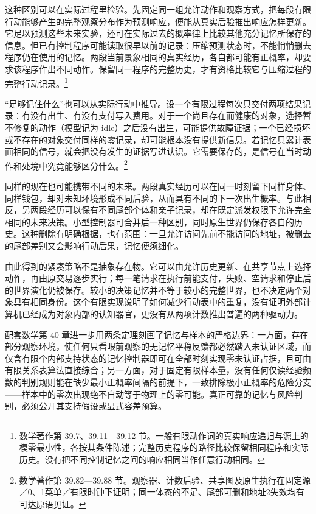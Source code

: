 \documentclass[
  11pt,
  oneside]{book}
\begin{document}
这种区别可以在实际过程里检验。先固定同一组允许动作和观察方式，把每段有限行动能够产生的完整观察分布作为预测响应，便能从真实后验推出响应怎样更新。它足以预测这些未来实验，还可在实际过去的概率律上比较其他充分记忆所保存的信息。但已有控制程序可能读取很早以前的记录：压缩预测状态时，不能悄悄删去程序仍在使用的记忆。两段当前景象相同的真实经历，各自都可能有正概率，却要求该程序作出不同动作。保留同一程序的完整历史，才有资格比较它与压缩过程的完整行动记录。\footnote{\hypertarget{ph-note-21}{}数学著作第 39.7、39.11---39.12 节。一般有限动作词的真实响应递归与源上的模零最小性，各按其条件陈述；完整历史程序的路径比较保留相同程序和实际历史。没有把不同控制记忆之间的响应相同当作任意行动相同。}

``足够记住什么''也可以从实际行动中推导。设一个有限过程每次只交付两项结果记录：有没有出生、有没有支付写入费用。对于一个尚且存在而健康的对象，选择暂不修复的动作（模型记为 idle）之后没有出生，可能提供故障证据；一个已经损坏或不存在的对象交付同样的零记录，却可能根本没有提供新信息。若记忆只累计表面相同的信号，就会把没有发生的证据写进认识。它需要保存的，是信号在当时动作和处境中究竟能够区分什么。\footnote{\hypertarget{ph-note-22}{}数学著作第 39.82---39.88 节。观察器、计数后验、共享图及原生执行在固定源／0、1菜单／有限时钟下证明；同一体态的不足、尾部可删和地址2失效均有可达原语见证。}

同样的现在也可能携带不同的未来。两段真实经历可以在同一时刻留下同样身体、同样钱包，却对未知环境形成不同后验，从而具有不同的下一次出生概率。与此相反，另两段经历可以保有不同尾部个体和亲子记录，却在既定派发权限下允许完全相同的未来决策。小型控制器可合并后一种区别，同时原生世界仍保存各自的历史。这种删除有明确根据，也有范围：一旦允许访问先前不能访问的地址，被删去的尾部差别又会影响行动后果，记忆便须细化。

由此得到的紧凑策略不是抽象存在物。它可以由允许历史更新、在共享节点上选择动作，再由原交易逐步实行；每一笔请求在执行前能支付，失败、空请求和停止后的世界演化仍被保存。较小的决策记忆并不等于较小的完整世界，也不决定两个对象具有相同身份。这个有限实现说明了如何减少行动表中的重复，没有证明外部计算机已经成为对象内部的认知器官，更没有从两项计数推出普遍的两种驱动力。

配套数学第 40 章进一步用两条定理刻画了记忆与样本的严格边界：一方面，存在部分观察环境，使任何只看眼前观察的无记忆平稳反馈都必然踏入未认证区域，而仅含有限个内部支持状态的记忆控制器即可在全部时刻实现零未认证占据，且可由有限关系表算法直接综合；另一方面，对于固定有限样本量，没有任何仅读经验频数的判别规则能在缺少最小正概率间隔的前提下，一致排除极小正概率的危险分支------样本中的零次出现绝不自动等于物理上的零可能。真正可靠的记忆与风险判别，必须公开其支持假设或显式容差预算。
\end{document}
